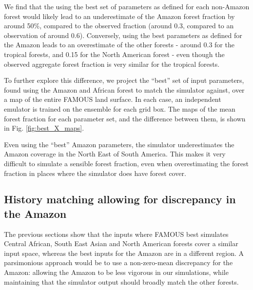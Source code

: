 \documentclass[esd, manuscript]{copernicus}
\begin{document}
We find that the using the best set of parameters as defined for each non-Amazon forest would likely lead to an underestimate of the Amazon forest fraction by around 50\%, compared to the observed fraction (around 0.3, compared to an observation of around 0.6). Conversely, using the best parameters as defined for the Amazon leads to an overestimate of the other forests - around 0.3 for the tropical forests, and 0.15 for the North American forest - even though the observed aggregate forest fraction is very similar for the tropical forests.


To further explore this difference, we project the ``best'' set of input parameters, found using the Amazon and African forest to match the simulator against, over a map of the entire FAMOUS land surface. In each case, an independent emulator is trained on the ensemble for each grid box. The maps of the mean forest fraction for each parameter set, and the difference between them, is shown in Fig. \ref{fig:best_X_maps}.

Even using the ``best'' Amazon parameters, the simulator underestimates the Amazon coverage in the North East of South America. This makes it very difficult to simulate a sensible forest fraction, even when overestimating the forest fraction in places where the simulator does have forest cover.

\subsection{History matching allowing for discrepancy in the Amazon}\label{ssec:hist_disc}

The previous sections show that the inputs where FAMOUS best simulates Central African, South East Asian and North American forests cover a similar input space, whereas the best inputs for the Amazon are in a different region. A parsimonious approach would be to use a non-zero-mean discrepancy for the Amazon: allowing the Amazon to be less vigorous in our simulations, while maintaining that the simulator output should broadly match the other forests.
\end{document}
